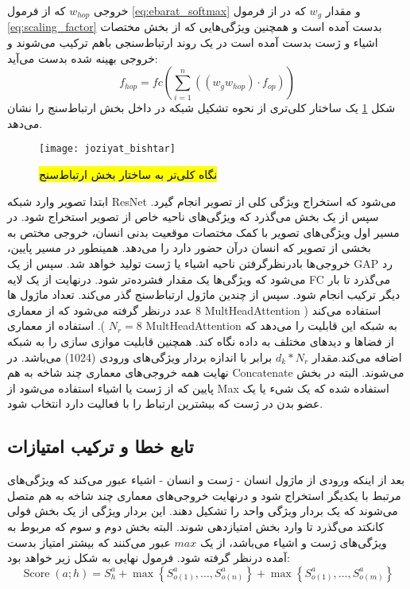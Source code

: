  خروجی %
  $w_{hop}$
  که از فرمول %
 \ref{eq:ebarat_softmax}
  و مقدار %
 $w_g$
 که در از فرمول %
 \ref{eq:scaling_factor}
 بدست آمده است و همچنین ویژگی‌هایی که از بخش مختصات اشیاء و ژست بدست آمده است در یک روند ارتباط‌سنجی باهم ترکیب می‌شوند و خروجی بهینه شده بدست می‌آید:
 \begin{equation}
 	f_{h o p}=f c\left(\sum_{i=1}^n\left(\left(w_g w_{h op}\right) \cdot f_{o p}\right)\right)
 \end{equation}
شکل %
   \ref{fig:joziyat_bishtar}
   یک ساختار کلی‌تری از نحوه تشکیل شبکه در داخل بخش ارتباط‌سنج را نشان می‌دهد. 
     \begin{figure}[ht]
   	\centerline{\texttt{[image: joziyat\_bishtar]}}
   	\caption{
   		\hl{نگاه کلی‌تر به ساختار بخش ارتباط‌سنج}
   	}
   	\label{fig:joziyat_bishtar}
   \end{figure}
ابتدا تصویر وارد شبکه ResNet می‌شود که استخراج ویژگی‌ کلی از تصویر انجام گیرد. سپس از یک بخش %
 می‌گذرد که ویژگی‌های ناحیه خاص از تصویر استخراج شود. در مسیر اول ویژگی‌های تصویر با کمک مختصات موقعیت بدنی انسان، خروجی مختص به بخشی از تصویر که انسان درآن حضور دارد را ‌می‌دهد. همینطور در مسیر پایین، خروجی‌ها بادرنظرگرفتن ناحیه اشیاء یا ژست تولید خواهد شد. سپس از یک GAP%
 رد می‌شود که ویژگی‌ها یک مقدار فشرده‌تر شود. درنهایت از یک لایه FC%
 می‌گذرد تا بار دیگر ترکیب انجام شود. سپس از چندین ماژول ارتباط‌سنج گذر می‌کند. تعداد ماژول ها 8 عدد درنظر گرفته می‌شود که از معماری %
   \gls{MultHeadAttention}
 استفاده می‌کند (
   $N_r=8$
  ). استفاده از معماری %
     \gls{MultHeadAttention}
  به شبکه این قابلیت را می‌دهد که از فضاها و دید‌های مختلف به داده نگاه کند. همچنین قابلیت موازی سازی را به شبکه اضافه می‌کند.مقدار %
   $d_k*N_r$
   برابر با اندازه بردار ویژگی‌های ورودی (1024) می‌باشد. در نهایت همه‌ خروجی‌های معماری چند شاخه به هم %
\gls{Concatenate}
    می‌شوند. البته در بخش پایین که از ژست یا اشیاء استفاده می‌شود از Max استفاده شده که یک شیء یا یک
عضو بدن در ژست که بیشترین ارتباط را با فعالیت دارد انتخاب شود.
      \subsection{تابع خطا و ترکیب امتیازات}
   بعد از اینکه ورودی از ماژول انسان - ژست و انسان - اشیاء عبور می‌کند که ویژگی‌های مرتبط با یکدیگر استخراج شود و درنهایت خروجی‌های معماری چند شاخه به هم متصل می‌شوند که یک بردار ویژگی واحد را تشکیل دهند. این بردار ویژگی از یک بخش فولی کانکتد می‌گذرد تا وارد بخش امتیازدهی شوند. 
   البته بخش دوم و سوم که مربوط به ویژگی‌های ژست و اشیاء می‌باشد، از یک %
   $max$
   عبور می‌کنند که بیشتر امتیاز بدست آمده درنظر گرفته شود. فرمول نهایی به شکل زیر خواهد بود:
   \begin{equation}
   	\operatorname{Score}(a ; h)=S_h^a+\max \left\{S_{o(1)}^a, \ldots, S_{o(n)}^a\right\}+\max \left\{S_{o(1)}^a, \ldots, S_{o(m)}^a\right\}
   \end{equation}
   
